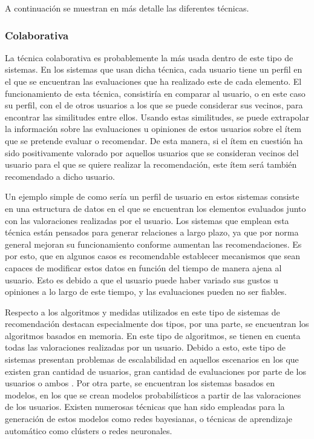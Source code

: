 A continuación se muestran en más detalle las diferentes técnicas.

\subsubsection{Colaborativa}
La técnica colaborativa es probablemente la más usada dentro de este tipo de sistemas. En los sistemas que usan dicha técnica, cada usuario tiene un perfil en el que se encuentran las evaluaciones que ha realizado este de cada elemento. El funcionamiento de esta técnica, consistiría en comparar al usuario, o en este caso su perfil, con el de otros  usuarios a los que se puede considerar sus vecinos, para encontrar las similitudes entre ellos. Usando estas similitudes, se puede extrapolar la información sobre las evaluaciones u opiniones de estos usuarios sobre el ítem que se pretende evaluar o recomendar. De esta manera, si el ítem en cuestión ha sido positivamente valorado por aquellos usuarios que se consideran vecinos del usuario para el que se quiere realizar la recomendación, este ítem será también recomendado a dicho usuario.

Un ejemplo simple de como sería un perfil de usuario en estos sistemas consiste en una estructura de datos en el que se encuentran los elementos evaluados junto con las valoraciones realizadas por el usuario. Los sistemas que emplean esta técnica están pensados para generar relaciones a largo plazo, ya que por norma general mejoran su funcionamiento conforme aumentan las recomendaciones. Es por esto, que en algunos casos es recomendable establecer mecanismos que sean capaces de modificar estos datos en función del tiempo de manera ajena al usuario. Esto es debido a que el usuario puede haber variado sus gustos u opiniones a lo largo de este tiempo, y las evaluaciones pueden no ser fiables. 

Respecto a los algoritmos y medidas utilizados en este tipo de sistemas de recomendación destacan especialmente dos tipos, por una parte, se encuentran los algoritmos basados en memoria\cite{Yu:2004:PMC:956382.956411}. En este tipo de algoritmos, se tienen en cuenta todas las valoraciones realizadas por un usuario. Debido a esto, este tipo de sistemas presentan problemas de escalabilidad en aquellos escenarios en los que existen gran cantidad de usuarios, gran cantidad de evaluaciones por parte de los usuarios o ambos \cite{lee2001collaborative}. Por otra parte, se encuentran los sistemas basados en modelos, en los que se crean modelos probabilísticos a partir de las valoraciones de los usuarios. Existen numerosas técnicas que han sido empleadas para la generación de estos modelos como redes bayesianas, o técnicas de aprendizaje automático como clústers o redes neuronales.

